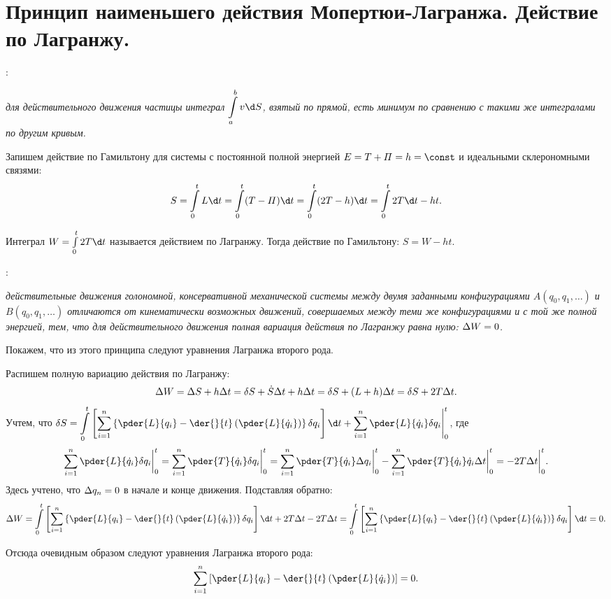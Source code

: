 \chapter{Принцип наименьшего действия Мопертюи-Лагранжа. Действие по Лагранжу.}

:

\emph{для действительного движения частицы интеграл
\( \ds \int\limits_a^b v\d S \), взятый по прямой, есть минимум по сравнению
с такими же интегралами по другим кривым.}

Запишем действие по Гамильтону для системы с постоянной полной энергией
\( E = T + \varPi = h = \const \) и идеальными склерономными связями:
\[
    S = \int\limits_0^t L\d t = \int\limits_0^t (T - \varPi)\d t =
    \int\limits_0^t (2T - h)\d t = \int\limits_0^t 2T\d t - ht.
\]

Интеграл \( W = \int\limits_0^t 2T\d t \) называется действием по Лагранжу.
Тогда действие по Гамильтону: \( S = W - ht \).

:

\emph{действительные движения голономной, консервативной механической системы
между двумя заданными конфигурациями \( A(q_0, q_1, \ldots) \) и \( B(q_0, q_1,
\ldots) \) отличаются от кинематически возможных движений, совершаемых между
теми же конфигурациями и с той же полной энергией, тем, что для действительного
движения полная вариация действия по Лагранжу равна нулю: \( \Delta W = 0 \).}

Покажем, что из этого принципа следуют уравнения Лагранжа второго рода.

Распишем полную вариацию действия по Лагранжу:
\[
    \Delta W = \Delta S + h\Delta t = \delta S + \dot{S}\Delta t + h\Delta t =
    \delta S + (L + h)\Delta t = \delta S + 2T\Delta t.
\]
Учтем, что \( \ds
    \delta S = \int\limits_0^t \left[\sum\limits_{i=1}^n \left\{\pder{L}{q_i} -
    \der{}{t}\left(\pder{L}{\dot{q}_i}\right)\right\}\delta q_i\right]\d t +
    \sum\limits_{i=1}^n \pder{L}{\dot{q}_i}\delta q_i\Biggr|_0^t \),
где
\[
    \sum\limits_{i=1}^n \pder{L}{\dot{q}_i}\delta q_i\biggr|_0^t =
    \sum\limits_{i=1}^n \pder{T}{\dot{q}_i}\delta q_i\biggr|_0^t =
    \sum\limits_{i=1}^n \pder{T}{\dot{q}_i}\D q_i\biggr|_0^t -
    \sum\limits_{i=1}^n \pder{T}{\dot{q}_i}\dot{q}_i\D t\biggr|_0^t =
    -2T\D t\biggr|_0^t.
\]
Здесь учтено, что \( \Delta q_n = 0 \) в начале и конце движения. Подставляя
обратно:
\[
    \D W = \int\limits_0^t \left[\sum\limits_{i=1}^n \left\{\pder{L}{q_i} -
    \der{}{t}\left(\pder{L}{\dot{q}_i}\right)\right\}\delta q_i\right]\d t +
    2T\D t - 2T\D t = \int\limits_0^t \left[\sum\limits_{i=1}^n \left\{
    \pder{L}{q_i} - \der{}{t}\left(\pder{L}{\dot{q}_i}\right)\right\}
    \delta q_i\right]\d t = 0.
\]

Отсюда очевидным образом следуют уравнения Лагранжа второго рода:
\[
    \sum\limits_{i=1}^n \left[\pder{L}{q_i} -
    \der{}{t}\left(\pder{L}{\dot{q}_i}\right)\right] = 0.
\]

\newpage
